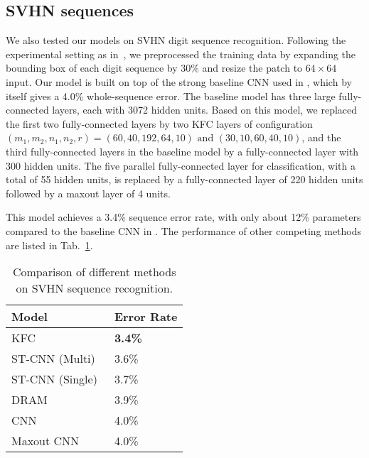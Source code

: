 \documentclass{article}
\begin{document}
\subsection{SVHN sequences}
We also tested our models on SVHN digit sequence recognition.
Following the experimental setting as in~\cite{Ref:Goodfellow2013,Ref:Ba2015},
we preprocessed the training data by expanding the bounding box of each digit sequence by 30\% and resize the patch to $64\times64$ input.
Our model is built on top of the strong baseline CNN used in \cite{Ref:Jaderberg2015},
which by itself gives a 4.0\% whole-sequence error.
The baseline model has three large fully-connected layers, each with 3072 hidden units.
Based on this model, we replaced the first two fully-connected layers by two KFC layers of configuration
$ (m_1, m_2, n_1, n_2, r) = (60, 40 ,192, 64, 10) \text{ and } (30, 10, 60, 40, 10)$, and the third fully-connected
layers in the baseline model by a fully-connected layer with 300 hidden units.
The five parallel fully-connected layer for classification, with a total of 55 hidden units, is replaced by a fully-connected
layer of 220 hidden units followed by a maxout layer of 4 units.

This model achieves a 3.4\% sequence error rate, with only about 12\% parameters compared to the baseline CNN in \cite{Ref:Jaderberg2015}.
The performance of other competing methods are listed in Tab.~\ref{Tab:SVHNseq}.

\begin{table}[!ht]\centering \small
  \caption{Comparison of different methods on SVHN sequence recognition.}
\label{Tab:SVHNseq}
\begin{tabular}{p{6cm} p{1.5cm}}
\toprule \textbf{Model}                           & \textbf{Error Rate} \\
\midrule KFC                           & \textbf{3.4\%}      \\
\midrule ST-CNN (Multi)~\cite{Ref:Jaderberg2015} & 3.6\%               \\
\midrule ST-CNN (Single)~\cite{Ref:Jaderberg2015}  & 3.7\%               \\
\midrule DRAM~\cite{Ref:Ba2015}                   & 3.9\%               \\
\midrule CNN~\cite{Ref:Jaderberg2015}             & 4.0\%               \\
\midrule Maxout CNN~\cite{Ref:Goodfellow2013}     & 4.0\%               \\
\hline
\end{tabular}
\end{table}
\end{document}
